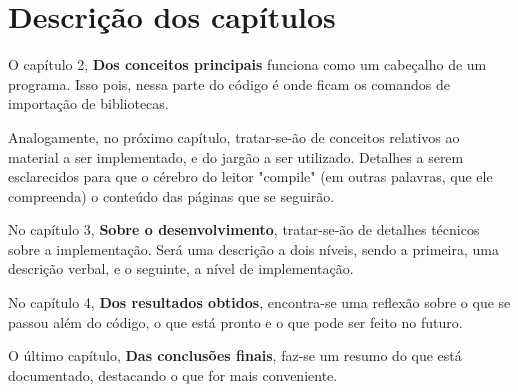 \section{Descrição dos capítulos}
\label{sec:description}

O capítulo 2, \textbf{Dos conceitos principais} funciona como um cabeçalho de um programa. Isso pois, nessa
parte do código é onde ficam os comandos de importação de bibliotecas.

Analogamente, no próximo capítulo, tratar-se-ão de conceitos relativos ao material a ser implementado, e do
jargão a ser utilizado. Detalhes a serem esclarecidos para que o cérebro do leitor "compile" (em outras palavras,
que ele compreenda) o conteúdo das páginas que se seguirão.

No capítulo 3, \textbf{Sobre o desenvolvimento}, tratar-se-ão de detalhes técnicos sobre a implementação. Será uma
descrição a dois níveis, sendo a primeira, uma descrição verbal, e o seguinte, a nível de implementação.

No capítulo 4, \textbf{Dos resultados obtidos}, encontra-se uma reflexão sobre o que se passou além do código, o que
está pronto e o que pode ser feito no futuro.

O último capítulo, \textbf{Das conclusões finais}, faz-se um resumo do que está documentado, destacando o que for mais
conveniente.
